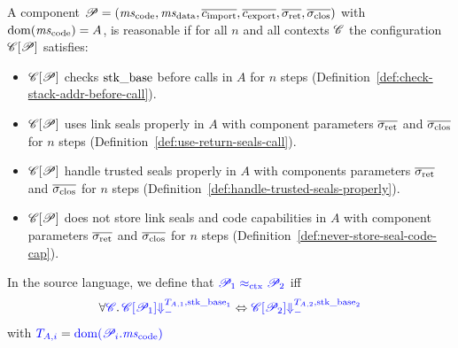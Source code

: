 \documentclass[a4paper]{article}
\begin{document}

\begin{definition}
  A component $\program = (\mscode,\msdata,\overline{c_{\mathrm{import}}},\overline{c_{\mathrm{export}}},\sigrets,\sigcloss)$ with $\dom(\mscode) = A$, is reasonable if for all $n$ and all contexts $\context$ the configuration $\plug{\context}{\program}$ satisfies:
  \begin{itemize}
  \item $\plug{\context}{\program}$ checks $\stkb$ before calls in $A$ for $n$ steps (Definition~\ref{def:check-stack-addr-before-call}).
  \item $\plug{\context}{\program}$ uses link seals properly in $A$ with component parameters $\sigrets$ and $\sigcloss$ for $n$ steps (Definition~\ref{def:use-return-seals-call}).
  \item $\plug{\context}{\program}$ handle trusted seals properly in $A$ with components parameters $\sigrets$ and $\sigcloss$ for $n$ steps (Definition~\ref{def:handle-trusted-seals-properly}).
  \item $\plug{\context}{\program}$ does not store link seals and code capabilities in $A$ with component parameters $\sigrets$ and $\sigcloss$ for $n$ steps (Definition~\ref{def:never-store-seal-code-cap}).
  \end{itemize}
\end{definition}

\begin{definition}
  In the source language, we define that $\src{\program_1 \sconeq \program_2}$ iff
  \begin{equation*}
    \forall \src{\context} \ldotp \src{\plug{\context}{\program_1} \sterm{\ta[,1],\stkb_1}} \Leftrightarrow \src{\plug{\context}{\program_2} \sterm{\ta[,2],\stkb_2}}
  \end{equation*}
  with $\src{\ta[,i]} = \src{\dom(\program_i.\mscode)}$
\end{definition}
\end{document}
